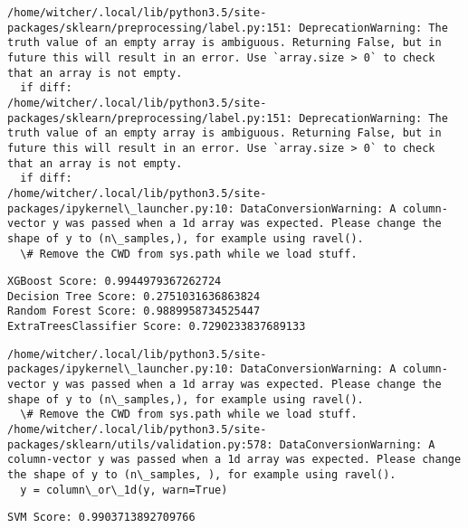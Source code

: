 \documentclass[11pt]{article}
\begin{document}
    \begin{Verbatim}[commandchars=\\\{\}]
/home/witcher/.local/lib/python3.5/site-packages/sklearn/preprocessing/label.py:151: DeprecationWarning: The truth value of an empty array is ambiguous. Returning False, but in future this will result in an error. Use `array.size > 0` to check that an array is not empty.
  if diff:
/home/witcher/.local/lib/python3.5/site-packages/sklearn/preprocessing/label.py:151: DeprecationWarning: The truth value of an empty array is ambiguous. Returning False, but in future this will result in an error. Use `array.size > 0` to check that an array is not empty.
  if diff:
/home/witcher/.local/lib/python3.5/site-packages/ipykernel\_launcher.py:10: DataConversionWarning: A column-vector y was passed when a 1d array was expected. Please change the shape of y to (n\_samples,), for example using ravel().
  \# Remove the CWD from sys.path while we load stuff.

    \end{Verbatim}

    \begin{Verbatim}[commandchars=\\\{\}]
XGBoost Score: 0.9944979367262724
Decision Tree Score: 0.2751031636863824
Random Forest Score: 0.9889958734525447
ExtraTreesClassifier Score: 0.7290233837689133

    \end{Verbatim}

    \begin{Verbatim}[commandchars=\\\{\}]
/home/witcher/.local/lib/python3.5/site-packages/ipykernel\_launcher.py:10: DataConversionWarning: A column-vector y was passed when a 1d array was expected. Please change the shape of y to (n\_samples,), for example using ravel().
  \# Remove the CWD from sys.path while we load stuff.
/home/witcher/.local/lib/python3.5/site-packages/sklearn/utils/validation.py:578: DataConversionWarning: A column-vector y was passed when a 1d array was expected. Please change the shape of y to (n\_samples, ), for example using ravel().
  y = column\_or\_1d(y, warn=True)

    \end{Verbatim}

    \begin{Verbatim}[commandchars=\\\{\}]
SVM Score: 0.9903713892709766

    \end{Verbatim}
\end{document}

